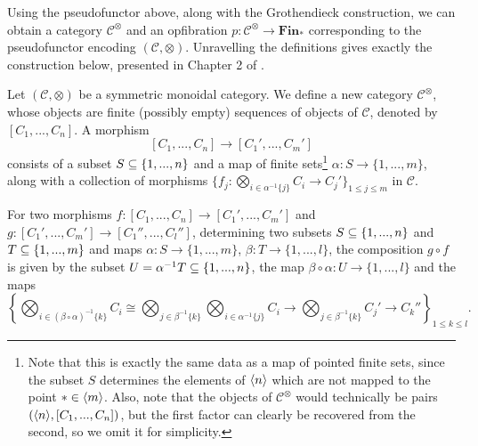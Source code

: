 \documentclass{MetricNotes2023}
\def\subq{\ensuremath\subseteq}
\begin{document}

Using the pseudofunctor above, along with the Grothendieck construction, we can obtain a category \(\mathcal{C}^\otimes\) and an opfibration \(p : \mathcal{C}^\otimes\to \textbf{Fin}_*\) corresponding to the pseudofunctor encoding \((\mathcal{C}, \otimes)\). Unravelling the definitions gives exactly the construction below, presented in Chapter 2 of \autocite{higheralgebra}. 

Let \((\mathcal{C}, \otimes)\) be a symmetric monoidal category. We define a new category \(\mathcal{C}^\otimes\), whose objects are finite (possibly empty) sequences of objects of \(\mathcal{C}\), denoted by \([C_1, ..., C_n]\). A morphism 
\[[C_1, ..., C_n]\to [C_1', ..., C_m']\]
consists of a subset \(S \subq \{1, ..., n\}\) and a map of finite sets\footnote{Note that this is exactly the same data as a map of pointed finite sets, since the subset \(S\) determines the elements of \(\langle n\rangle\) which are not mapped to the point \(*\in \langle m\rangle\). Also, note that the objects of \(\mathcal{C}^\otimes\) would technically be pairs \((\langle n\rangle,[C_1, ..., C_n])\), but the first factor can clearly be recovered from the second, so we omit it for simplicity.} \(\alpha : S \to \{1, ..., m\}\), along with a collection of morphisms \(\{f_j : \bigotimes_{i \in \alpha^{-1}\{j\}} C_i \to C_j'\}_{1 \leq j \leq m}\) in \(\mathcal{C}\). 

For two morphisms \(f : [C_1, ..., C_n]\to [C_1', ..., C_m']\) and \(g : [C_1', ..., C_m']\to[C_1'', ..., C_l'']\), determining two subsets \(S \subq \{1, ..., n\}\) and \(T \subq \{1, ..., m\}\) and maps \(\alpha : S \to \{1, ..., m\}\), \(\beta : T \to \{1, ..., l\}\), the composition \(g \circ f\) is given by the subset \(U = \alpha^{-1}T \subq \{1, ..., n\}\), the map \(\beta \circ \alpha : U \to \{1, ..., l\}\) and the maps 
\[\left\{\bigotimes_{i \in (\beta \circ \alpha)^{-1}\{k\}} C_i \cong \bigotimes_{j \in \beta^{-1}\{k\}}\bigotimes_{i \in \alpha^{-1}\{j\}}C_i \to \bigotimes_{j \in \beta^{-1}\{k\}}C_j' \to C_k''\right\}_{1 \leq k \leq l}.\] 
\end{document}
